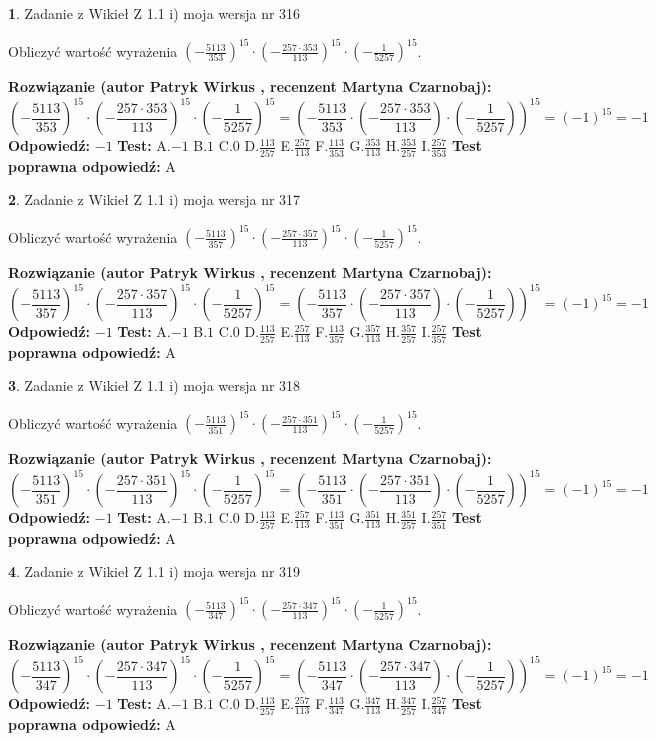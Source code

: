 \documentclass[12pt, a4paper]{article}
\theoremstyle{definition} %
\newtheorem{zad}{}
\newcommand{\zadStart}[1]{\begin{zad}#1\newline}
\newcommand{\zadStop}{\end{zad}}
\newcommand{\rozwStart}[2]{\noindent \textbf{Rozwiązanie (autor #1 , recenzent #2): }\newline}
\newcommand{\rozwStop}{\newline}
\newcommand{\odpStart}{\noindent \textbf{Odpowiedź:}\newline}
\newcommand{\odpStop}{\newline}
\newcommand{\testStart}{\noindent \textbf{Test:}\newline}
\newcommand{\testStop}{\newline}
\newcommand{\kluczStart}{\noindent \textbf{Test poprawna odpowiedź:}\newline}
\newcommand{\kluczStop}{\newline}
\begin{document}
\zadStart{Zadanie z Wikieł Z 1.1 i) moja wersja nr 316}

Obliczyć wartość wyrażenia $(-\frac{5113}{353})^{15} \cdot (-\frac{257 \cdot 353}{113})^{15} \cdot (-\frac{1}{5257})^{15}$.
\zadStop
\rozwStart{Patryk Wirkus}{Martyna Czarnobaj}
$$(-\frac{5113}{353})^{15} \cdot (-\frac{257 \cdot 353}{113})^{15} \cdot (-\frac{1}{5257})^{15} = (-\frac{5113}{353} \cdot (-\frac{257 \cdot 353}{113}) \cdot (-\frac{1}{5257}))^{15} = (-1)^{15} = -1$$
\rozwStop
\odpStart
$-1$
\odpStop
\testStart
A.$-1$ B.$1$ C.$0$ D.$\frac{113}{257}$ E.$\frac{257}{113}$
F.$\frac{113}{353}$ G.$\frac{353}{113}$
H.$\frac{353}{257}$
I.$\frac{257}{353}$
\testStop
\kluczStart
A
\kluczStop



\zadStart{Zadanie z Wikieł Z 1.1 i) moja wersja nr 317}

Obliczyć wartość wyrażenia $(-\frac{5113}{357})^{15} \cdot (-\frac{257 \cdot 357}{113})^{15} \cdot (-\frac{1}{5257})^{15}$.
\zadStop
\rozwStart{Patryk Wirkus}{Martyna Czarnobaj}
$$(-\frac{5113}{357})^{15} \cdot (-\frac{257 \cdot 357}{113})^{15} \cdot (-\frac{1}{5257})^{15} = (-\frac{5113}{357} \cdot (-\frac{257 \cdot 357}{113}) \cdot (-\frac{1}{5257}))^{15} = (-1)^{15} = -1$$
\rozwStop
\odpStart
$-1$
\odpStop
\testStart
A.$-1$ B.$1$ C.$0$ D.$\frac{113}{257}$ E.$\frac{257}{113}$
F.$\frac{113}{357}$ G.$\frac{357}{113}$
H.$\frac{357}{257}$
I.$\frac{257}{357}$
\testStop
\kluczStart
A
\kluczStop



\zadStart{Zadanie z Wikieł Z 1.1 i) moja wersja nr 318}

Obliczyć wartość wyrażenia $(-\frac{5113}{351})^{15} \cdot (-\frac{257 \cdot 351}{113})^{15} \cdot (-\frac{1}{5257})^{15}$.
\zadStop
\rozwStart{Patryk Wirkus}{Martyna Czarnobaj}
$$(-\frac{5113}{351})^{15} \cdot (-\frac{257 \cdot 351}{113})^{15} \cdot (-\frac{1}{5257})^{15} = (-\frac{5113}{351} \cdot (-\frac{257 \cdot 351}{113}) \cdot (-\frac{1}{5257}))^{15} = (-1)^{15} = -1$$
\rozwStop
\odpStart
$-1$
\odpStop
\testStart
A.$-1$ B.$1$ C.$0$ D.$\frac{113}{257}$ E.$\frac{257}{113}$
F.$\frac{113}{351}$ G.$\frac{351}{113}$
H.$\frac{351}{257}$
I.$\frac{257}{351}$
\testStop
\kluczStart
A
\kluczStop



\zadStart{Zadanie z Wikieł Z 1.1 i) moja wersja nr 319}

Obliczyć wartość wyrażenia $(-\frac{5113}{347})^{15} \cdot (-\frac{257 \cdot 347}{113})^{15} \cdot (-\frac{1}{5257})^{15}$.
\zadStop
\rozwStart{Patryk Wirkus}{Martyna Czarnobaj}
$$(-\frac{5113}{347})^{15} \cdot (-\frac{257 \cdot 347}{113})^{15} \cdot (-\frac{1}{5257})^{15} = (-\frac{5113}{347} \cdot (-\frac{257 \cdot 347}{113}) \cdot (-\frac{1}{5257}))^{15} = (-1)^{15} = -1$$
\rozwStop
\odpStart
$-1$
\odpStop
\testStart
A.$-1$ B.$1$ C.$0$ D.$\frac{113}{257}$ E.$\frac{257}{113}$
F.$\frac{113}{347}$ G.$\frac{347}{113}$
H.$\frac{347}{257}$
I.$\frac{257}{347}$
\testStop
\kluczStart
A
\kluczStop
\end{document}
